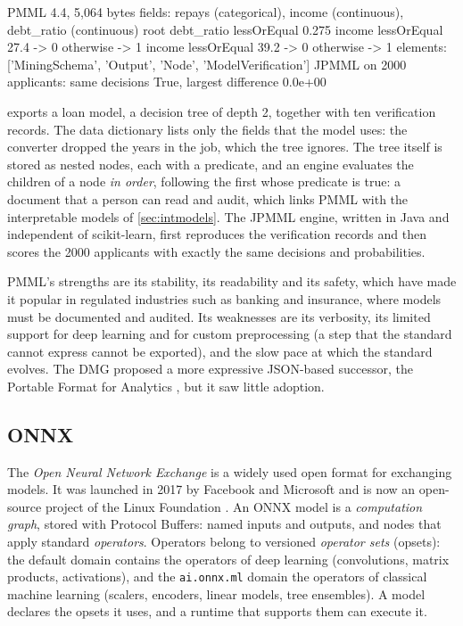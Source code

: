 \begin{pyoutput}
PMML 4.4, 5,064 bytes
fields: repays (categorical), income (continuous), debt_ratio (continuous)
  root
    debt_ratio lessOrEqual 0.275
      income lessOrEqual 27.4 -> 0
      otherwise -> 1
    income lessOrEqual 39.2 -> 0
    otherwise -> 1
elements: ['MiningSchema', 'Output', 'Node', 'ModelVerification']
JPMML on 2000 applicants: same decisions True, largest difference 0.0e+00
\end{pyoutput}

 exports a loan model, a decision tree of depth 2, together with ten verification records.
The data dictionary lists only the fields that the model uses: the converter dropped the years in the
job, which the tree ignores. The tree itself is stored as nested nodes, each with a predicate, and an
engine evaluates the children of a node \emph{in order}, following the first whose predicate is true:
a document that a person can read and audit, which links PMML with the interpretable models of
\cref{sec:intmodels}. The JPMML engine, written in Java and independent of scikit-learn, first reproduces
the verification records and then scores the 2000 applicants with exactly the same decisions and
probabilities.

PMML's strengths are its stability, its readability and its safety, which have made it popular in
regulated industries such as banking and insurance, where models must be documented and audited. Its
weaknesses are its verbosity, its limited support for deep learning and for custom preprocessing (a step
that the standard cannot express cannot be exported), and the slow pace at which the standard evolves.
The DMG proposed a more expressive JSON-based successor, the Portable Format for Analytics
\citep{pivarski2016deploying}, but it saw little adoption.

\subsection{ONNX}

The \emph{Open Neural Network Exchange} is a widely used open format for exchanging models.
It was launched in 2017 by Facebook and Microsoft and is now an open-source project of the Linux
Foundation \citep{onnx2019}. An ONNX model is a \emph{computation graph}, stored with Protocol Buffers:
named inputs and outputs, and nodes that apply standard \emph{operators}. Operators belong to versioned
\emph{operator sets} (opsets): the default domain contains the operators of deep learning (convolutions,
matrix products, activations), and the \texttt{ai.onnx.ml} domain the operators of classical machine
learning (scalers, encoders, linear models, tree ensembles). A model declares the opsets it uses, and a
runtime that supports them can execute it.

